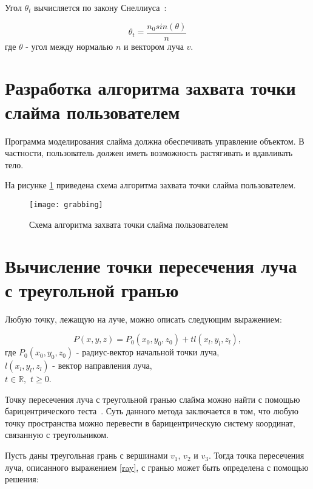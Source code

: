 Угол $\theta_t$ вычисляется по закону Снеллиуса~\cite{raytracingen}:

\begin{equation}\label{snell}
	\theta_t = \frac{n_0sin(\theta)}{n}
\end{equation}
где $\theta$ - угол между нормалью $n$ и вектором луча $v$.

\section{Разработка алгоритма захвата точки слайма пользователем}

Программа моделирования слайма должна обеспечивать управление объектом. В частности, пользователь должен иметь возможность растягивать и вдавливать тело.

На рисунке \ref{grabbing} приведена схема алгоритма захвата точки слайма пользователем.

\begin{figure}[H]
	\centering
	\texttt{[image: grabbing]}
	\caption{Схема алгоритма захвата точки слайма пользователем}
	\label{grabbing}
\end{figure}

\section{Вычисление точки пересечения луча с треугольной гранью}

Любую точку, лежащую на луче, можно описать следующим выражением:

\begin{equation}\label{ray}
	P(x, y, z) = P_0(x_0, y_0, z_0) + tl(x_l, y_l, z_l),
\end{equation}
где $P_0(x_0, y_0, z_0)$ - радиус-вектор начальной точки луча,\\
\text{~~~~~~}$l(x_l, y_l, z_l)$ - вектор направления луча,\\
\text{~~~~~~}$t \in \mathbb{R},$ $t \ge 0$.

Точку пересечения луча с треугольной гранью слайма можно найти с помощью барицентрического теста~\cite{intersection}. Суть данного метода заключается в том, что любую точку пространства можно перевести в барицентрическую систему координат, связанную с треугольником.

Пусть даны треугольная грань с вершинами $v_1$, $v_2$ и $v_3$. Тогда точка пересечения луча, описанного выражением \eqref{ray}, с гранью может быть определена с помощью решения:

